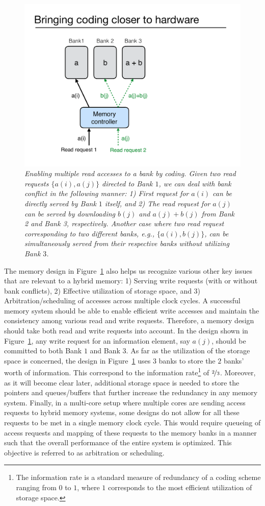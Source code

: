 \begin{figure}[t!]
\centering
\includegraphics[width=0.395\linewidth]{fig/example-xor.pdf}
\caption{\it{Enabling multiple read accesses to a bank by coding. Given two read requests $\{a(i), a(j)\}$ directed to Bank $1$, we can deal with bank conflict in the following manner: 1) First request for $a(i)$ can be directly served by Bank $1$ itself, and 2) The read request for $a(j)$ can be served by downloading $b(j)$ and $a(j) + b(j)$ from Bank 2 and Bank 3, respectively. Another case where two read request corresponding to two different banks, e.g., $\{a(i), b(j)\}$, can be simultaneously served from their respective banks without utilizing Bank $3$.}}
\label{fig:example_xor}
\end{figure}
The memory design in Figure~\ref{fig:example_xor} also helps us recognize various other key issues that are relevant to a hybrid memory: 1) Serving write requests (with or without bank conflicts), 2) Effective utilization of storage space, and 3) Arbitration/scheduling of accesses across multiple clock cycles. A successful memory system should be able to enable efficient write accesses and maintain the consistency among various read and write requests. Therefore, a memory design should take both read and write requests into account. In the design shown in Figure~\ref{fig:example_xor}, any write request for an information element, say $a(j)$, should be committed to both Bank $1$ and Bank $3$. As far as the utilization of the storage space is concerned, the design in Figure~\ref{fig:example_xor} uses $3$ banks to store the $2$ banks' worth of information. This correspond to the information rate\footnote{The information rate is a standard measure of redundancy of a coding scheme ranging from $0$ to $1$, where $1$ corresponds to the most efficient utilization of storage space.} of $\nicefrac{2}{3}$. Moreover, as it will become clear later, additional storage space is needed to store the pointers and queues/buffers that further increase the redundancy in any memory system. {\color{red}Finally, in a multi-core setup where multiple cores are sending access requests to hybrid memory systems, some designs do not allow for all these requests to be met in a single memory clock cycle. This would require queueing of access requests and mapping of these requests to the memory banks in a manner such that the overall performance of the entire system is optimized. This objective is referred to as arbitration or scheduling.}

